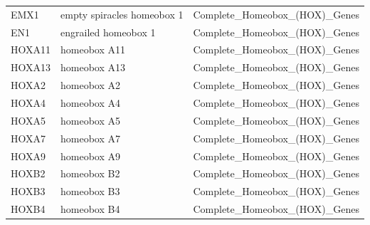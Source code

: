 \documentclass[11pt]{article}
\begin{document}
\begin{table}[H]
{\begin{tabular}{|l|l|l|}
EMX1    & empty spiracles homeobox 1                                                                                     & Complete\_Homeobox\_(HOX)\_Genes                         \\
EN1     & engrailed homeobox 1                                                                                           & Complete\_Homeobox\_(HOX)\_Genes                         \\
HOXA11  & homeobox A11                                                                                                   & Complete\_Homeobox\_(HOX)\_Genes                         \\
HOXA13  & homeobox A13                                                                                                   & Complete\_Homeobox\_(HOX)\_Genes                         \\
HOXA2   & homeobox A2                                                                                                    & Complete\_Homeobox\_(HOX)\_Genes                         \\
HOXA4   & homeobox A4                                                                                                    & Complete\_Homeobox\_(HOX)\_Genes                         \\
HOXA5   & homeobox A5                                                                                                    & Complete\_Homeobox\_(HOX)\_Genes                         \\
HOXA7   & homeobox A7                                                                                                    & Complete\_Homeobox\_(HOX)\_Genes                         \\
HOXA9   & homeobox A9                                                                                                    & Complete\_Homeobox\_(HOX)\_Genes                         \\
HOXB2   & homeobox B2                                                                                                    & Complete\_Homeobox\_(HOX)\_Genes                         \\
HOXB3   & homeobox B3                                                                                                    & Complete\_Homeobox\_(HOX)\_Genes                         \\
HOXB4   & homeobox B4                                                                                                    & Complete\_Homeobox\_(HOX)\_Genes                         \\

\end{tabular}}
\end{table}
\end{document}

